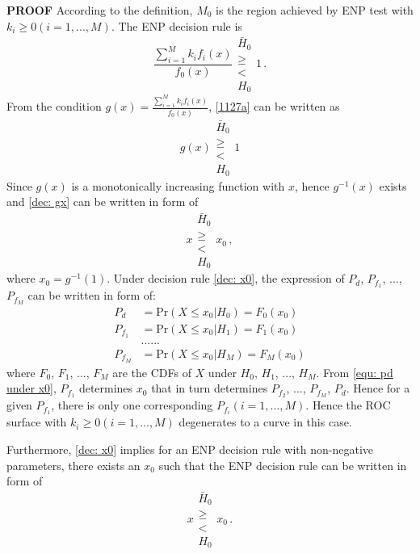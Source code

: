 \noindent \textbf{PROOF}
According to the definition, $M_0$ is the region achieved by ENP test with $k_i \geq 0 (i=1, ..., M)$. The ENP decision rule is
\begin{equation}
\label{1127a}
\frac{\sum_{i=1}^{M}k_if_i(x)}{f_0(x)} \substack{\bar{H}_0 \\\geq\\< \\H_0}1\,.
\end{equation}
From the condition $g(x) = \frac{\sum_{i=1}^{M}k_if_i(x)}{f_0(x)} $, \eqref{1127a} can be written as 
\begin{equation}
\label{dec: gx}
g(x)\substack{\bar{H}_0 \\\geq\\< \\H_0}1
\end{equation}
Since $g(x)$ is a monotonically increasing function with $x$, hence $g^{-1}(x)$ exists and \eqref{dec: gx} can be written in form of 
\begin{equation}
\label{dec: x0}
x\substack{\bar{H}_0 \\\geq\\< \\H_0}x_0\,,
\end{equation}
where $x_0 = g^{-1}(1)$.
Under decision rule \eqref{dec: x0}, the expression of $P_d$, $P_{f_1}$, ..., $P_{f_M}$ can be written in form of: 
\begin{equation}
\begin{split}
\label{equ: pd under x0}
P_d &= \text{Pr}(X \leq x_0 | H_0) = F_0(x_0)\\
P_{f_1} &= \text{Pr}(X \leq x_0 | H_1) = F_1(x_0)\\
  &......\\
P_{f_M} &= \text{Pr}(X \leq x_0 | H_M) = F_M(x_0)
\end{split}
\end{equation}
where $F_0$, $F_1$, ..., $F_M$ are the CDFs of $X$ under $H_0$, $H_1$, ..., $H_M$. From \eqref{equ: pd under x0}, $P_{f_1}$ determines $x_0$ that in turn determines $P_{f_2}$, ..., $P_{f_M}$, $P_d$. Hence for a given $P_{f_1}$, there is only one corresponding $P_{f_i} (i= 1, ..., M)$. Hence the ROC surface with $k_i \geq 0 (i = 1, ..., M)$ degenerates to a curve in this case.

Furthermore, \eqref{dec: x0}  implies for an ENP decision rule with non-negative parameters, there exists an $x_0$ such that the ENP decision rule can be written in form of 
\begin{equation}
\label{1125 dec: x0}
x\substack{\bar{H}_0 \\\geq\\< \\H_0}x_0\,.
\end{equation}

